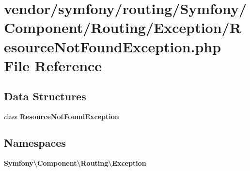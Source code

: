 \section{vendor/symfony/routing/\+Symfony/\+Component/\+Routing/\+Exception/\+Resource\+Not\+Found\+Exception.php File Reference}
\label{_resource_not_found_exception_8php}
\subsection*{Data Structures}
\begin{DoxyCompactItemize}
\item 
class {\bf Resource\+Not\+Found\+Exception}
\end{DoxyCompactItemize}
\subsection*{Namespaces}
\begin{DoxyCompactItemize}
\item 
 {\bf Symfony\textbackslash{}\+Component\textbackslash{}\+Routing\textbackslash{}\+Exception}
\end{DoxyCompactItemize}
